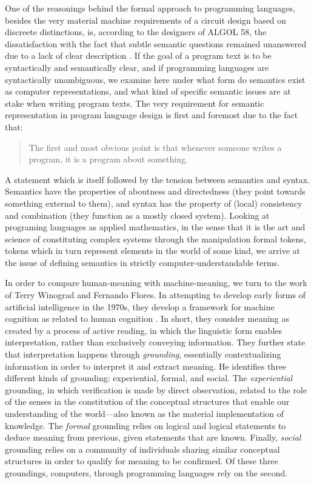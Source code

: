 One of the reasonings behind the formal approach to programming languages, besides the very material machine requirements of a circuit design based on discreete distinctions, is, according to the designers of ALGOL 58, the dissatisfaction with the fact that subtle semantic questions remained unanswered due to a lack of clear description \citep{sethi_programming_1996}. If the goal of a program text is to be syntactically and semantically clear, and if programming languages are syntactically unambiguous, we examine here under what form do semantics exist as computer representations, and what kind of specific semantic issues are at stake when writing program texts. The very requirement for semantic representation in program language design is first and foremost due to the fact that:

\begin{quote}
  The first and most obvious point is that whenever someone writes a program, it is a program about something. \citep{winograd_language_1982}
\end{quote}

A statement which is itself followed by the tension between semantics and syntax. Semantics have the properties of aboutness and directedness (they point towards something external to them), and syntax has the property of (local) consistency and combination (they function as a mostly closed system). Looking at programing languages as applied mathematics, in the sense that it is the art and science of constituting complex systems through the manipulation formal tokens, tokens which in turn represent elements in the world of some kind, we arrive at the issue of defining semantics in strictly computer-understandable terms.

In order to compare human-meaning with machine-meaning, we turn to the work of Terry Winograd and Fernando Flores. In attempting to develop early forms of artificial intelligence in the 1970s, they develop a framework for machine cognition as related to human cognition \citep{winograd_understanding_1986}. In short, they consider meaning as created by a process of active reading, in which the linguistic form enables interpretation, rather than exclusively conveying information. They further state that interpretation happens through \emph{grounding}, essentially contextualizing information in order to interpret it and extract meaning. He identifies three different kinds of grounding: experiential, formal, and social. The \emph{experiential} grounding, in which verification is made by direct observation, related to the role of the senses in the constitution of the conceptual structures that enable our understanding of the world—also known as the material implementation of knowledge. The \emph{formal} grounding relies on logical and logical statements to deduce meaning from previous, given statements that are known. Finally, \emph{social} grounding relies on a community of individuals sharing similar conceptual structures in order to qualify for meaning to be confirmed. Of these three groundings, computers, through programming languages rely on the second.

